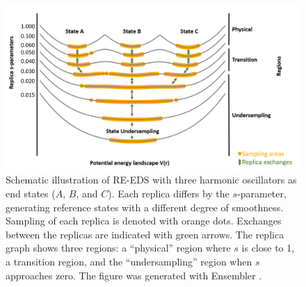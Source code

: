 \begin{figure}[h]
    \centering
    \includegraphics[width=\columnwidth]{fig/theory/Reeds_scheme_first.png}
    \caption{Schematic illustration of RE-EDS with three harmonic oscillators as end states ($A$, $B$, and $C$). Each replica differs by the $s$-parameter, generating reference states with a different degree of smoothness. Sampling of each replica is denoted with orange dots. Exchanges between the replicas are indicated with green arrows. The replica graph shows three regions: a ``physical'' region where $s$ is close to 1, a transition region, and the ``undersampling'' region when $s$ approaches zero. The figure was generated with Ensembler \cite{Ries2021A}.}
    \label{fig:RE-EDS_Scheme}
\end{figure}

\FloatBarrier

